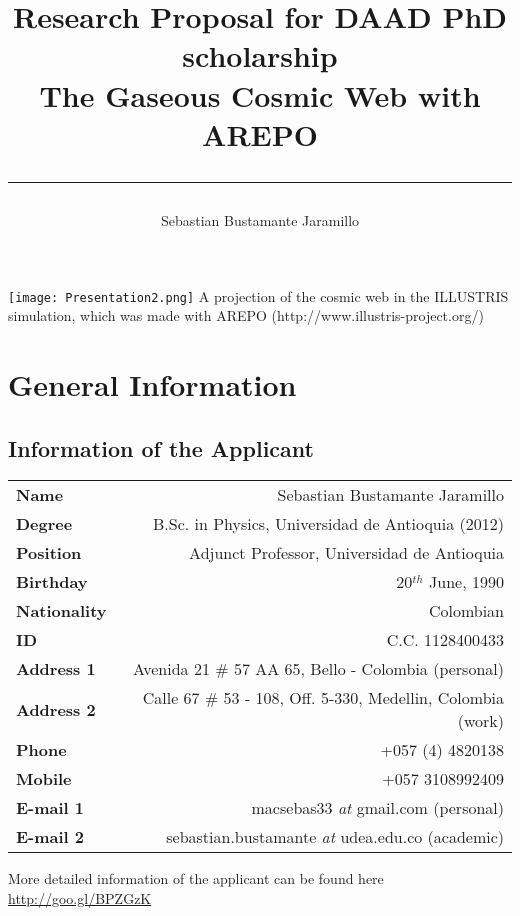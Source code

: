 \documentclass[a4,useAMS,usenatbib,usegraphicx,12pt]{article}
\title{{\textbf{Research Proposal for DAAD PhD scholarship}}\\ The Gaseous Cosmic Web with AREPO\\ \color{black}\rule{15cm}{0.5mm}}
\author{Sebastian Bustamante Jaramillo}
\date{}
\begin{document}
\maketitle
\begin{center}
\texttt{[image: Presentation2.png]}
\tiny{A projection of the cosmic web in the ILLUSTRIS simulation, which was made 
with AREPO (http://www.illustris-project.org/)}
\end{center}
\tableofcontents
 
\newpage 

\section{General Information}
\small
\subsection*{Information of the Applicant}
\begin{tabular}{L!{\VRule}R}
\bf Name		& Sebastian Bustamante Jaramillo\\
\bf Degree		& B.Sc. in Physics, Universidad de Antioquia (2012)\\
\bf Position	& Adjunct Professor, Universidad de Antioquia\\
\bf Birthday	& { 20$^{th}$ June, 1990}\\
\bf Nationality & Colombian\\
\bf ID			& C.C. 1128400433\\
\bf Address 1	& Avenida 21 \# 57 AA 65, Bello - Colombia (personal)\\
\bf Address 2	& Calle 67 \# 53 - 108, Off. 5-330, Medellin, Colombia (work)\\
\bf Phone		& +057 (4) 4820138\\
\bf Mobile		& +057 3108992409\\
\bf E-mail 1	& macsebas33 \textit{at} gmail.com (personal)\\
\bf E-mail 2	& sebastian.bustamante \textit{at} udea.edu.co (academic)\\
\end{tabular}

\vspace{10pt}

More detailed information of the applicant can be found here \url{http://goo.gl/BPZGzK}

\vspace{15pt}  
\end{document}
